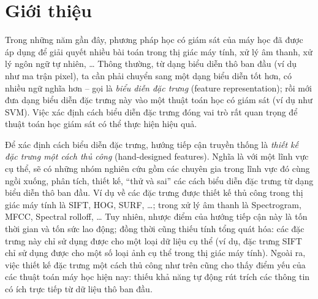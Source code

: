 
\chapter{Giới thiệu }
\ifpdf
    \graphicspath{{Chapter1/Chapter1Figs/PNG/}{Chapter1/Chapter1Figs/PDF/}{Chapter1/Chapter1Figs/}}
\else
    \graphicspath{{Chapter1/Chapter1Figs/EPS/}{Chapter1/Chapter1Figs/}}
\fi


Trong những năm gần đây, phương pháp học có giám sát của máy học đã được áp dụng để giải quyết nhiều bài toán trong thị giác máy tính, xử lý âm thanh, xử lý ngôn ngữ tự nhiên, … Thông thường, từ dạng biểu diễn thô ban đầu (ví dụ như ma trận pixel), ta cần phải chuyển sang một dạng biểu diễn tốt hơn, có nhiều ngữ nghĩa hơn – gọi là \emph{biểu diễn đặc trưng} (feature representation); rồi mới đưa dạng biểu diễn đặc trưng này vào một thuật toán học có giám sát (ví dụ như SVM). Việc xác định cách biểu diễn đặc trưng đóng vai trò rất quan trọng để thuật toán học giám sát có thể thực hiện hiệu quả. 

Để xác định cách biểu diễn đặc trưng, hướng tiếp cận truyền thống là \emph{thiết kế đặc trưng một cách thủ công} (hand-designed features). Nghĩa là với một lĩnh vực cụ thể, sẽ có những nhóm nghiên cứu gồm các chuyên gia trong lĩnh vực đó cùng ngồi xuống, phân tích, thiết kế, ``thử và sai'' các cách biểu diễn đặc trưng từ dạng biểu diễn thô ban đầu. Ví dụ về các đặc trưng được thiết kế thủ công trong thị giác máy tính là SIFT, HOG, SURF, …; trong xử lý âm thanh là Spectrogram, MFCC, Spectral rolloff, … Tuy nhiên, nhược điểm của hướng tiếp cận này là tốn thời gian và tốn sức lao động; đồng thời cũng thiếu tính tổng quát hóa: các đặc trưng này chỉ sử dụng được cho một loại dữ liệu cụ thể (ví dụ, đặc trưng SIFT chỉ sử dụng được cho một số loại ảnh cụ thể trong thị giác máy tính). Ngoài ra, việc thiết kế đặc trưng một cách thủ công như trên cũng cho thấy điểm yếu của các thuật toán máy học hiện nay: thiếu khả năng tự động rút trích các thông tin có ích trực tiếp từ dữ liệu thô ban đầu.

